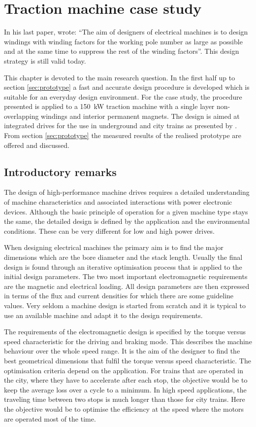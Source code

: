 \chapter{Traction machine case study}\label{chap:design}
In his last paper, \cite{Klima1979} wrote: ``The aim of designers of electrical machines is to design windings with winding factors for the working pole number as large as possible and at the same time to suppress the rest of the winding factors''. This design strategy is still valid today. 

This chapter is devoted to the main research question. In the first half up to section \ref{sec:prototype} a fast and accurate design procedure is developed which is suitable for an everyday design environment. For the case study, the procedure presented is  applied to a \SI{150}{kW} traction machine with a single layer non-overlapping windings and interior permanent magnets. The design is aimed at integrated drives for the use in underground and city trains as presented by \cite{Joeckel2006}. From section \ref{sec:prototype} the measured results of the realised prototype are offered and discussed. 

\section{Introductory remarks}
The design of high-performance machine drives requires a detailed understanding of machine characteristics and associated interactions with power electronic devices.  Although the basic principle of operation for a given machine type stays the same, the detailed design is defined by the application and the environmental conditions. These can be very different for low and high power drives.

When designing electrical machines the primary aim is to find the major dimensions which are the bore diameter and the stack length. Usually the final design is found through an iterative optimisation process that is applied to the initial design parameters. The two most important electromagnetic requirements are the magnetic and electrical loading. All design parameters are then expressed in terms of the flux and current densities for which there are some guideline values. Very seldom a machine design is started from scratch and it is typical to use an available machine and adapt it to the design requirements.

The requirements of the electromagnetic design is specified by the torque versus speed characteristic for the driving and braking mode. This describes the machine behaviour over the whole speed range. It is the aim of the designer to find the best geometrical dimensions that fulfil the torque versus speed characteristic. The optimisation criteria depend on the application. For trains that are operated in the city, where they have to accelerate after each stop, the objective would be to keep the average loss over a cycle to a minimum. In high speed applications, the traveling time between two stops is much longer than those for city trains. Here the objective would be to optimise the efficiency at the speed where the motors are operated most of the time. 

